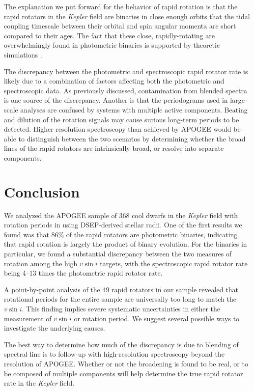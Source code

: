 \documentclass[manuscript]{aastex6}
\newcommand{\vsini}{\ensuremath{v \sin i}}
\newcommand{\Kepler}{\mbox{\textit{Kepler}}}
\begin{document}
The explanation we put forward for the behavior of rapid rotation is that the
rapid rotators in the \Kepler{} field are binaries in close enough orbits that
the tidal coupling timescale between their orbital and spin angular momenta are
short compared to their ages. The fact that these close, rapidly-rotating are
overwhelmingly found in photometric binaries is supported by theoretic
simulations \citep{Bate02}. 

The discrepancy between the photometric and spectroscopic rapid rotator rate is
likely due to a combination of factors affecting both the photometric and
spectroscopic data. As previously discussed, contamination from blended spectra
is one source of the discrepancy. Another is that the periodograms used in 
large-scale analyses are confused by systems with multiple active components.
Beating and dilution of the rotation signals may cause surious long-term
periods to be detected. Higher-resolution spectroscopy than achieved by APOGEE
would be able to distinguish between the two scenarios by determining whether
the broad lines of the rapid rotators are intrinsically broad, or resolve into
separate components.

\section{Conclusion}
\label{sec:conclusions}

We analyzed the APOGEE sample of 368 cool dwarfs in the \Kepler{} field with 
rotation periods in \citet{McQuillan14} using DSEP-derived stellar radii. One
of the first results we found was that 86\% of the rapid rotators are
photometric binaries, indicating that rapid rotation is largely the product of
binary evolution. For the binaries in particular, we
found a substantial discrepancy between the two measures of rotation
among the high \vsini{} targets, with the spectroscopic rapid
rotator rate being 4--13 times the photometric rapid rotator rate. 

A point-by-point analysis of the 49 rapid rotators in our sample revealed that
rotational periods for the entire sample are universally too long to match the 
\vsini{}. This finding implies severe systematic uncertainties in either the
measurement of \vsini{} or rotation period. We suggest several possible ways 
to investigate the underlying causes.

The best way to determine how much of the discrepancy is due to blending of
spectral line is to follow-up with high-resolution spectroscopy beyond the
resolution of APOGEE\@. Whether or not the broadening is found to be real, or to
be composed of multiple components will help determine the true rapid
rotator rate in the \Kepler{} field.
\end{document}
